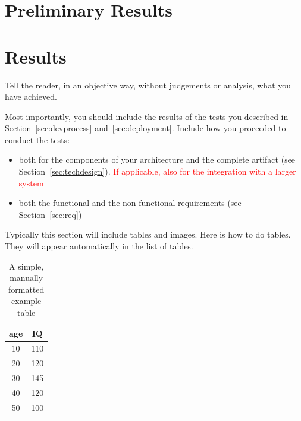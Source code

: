 \ifmidterm
\chapter{Preliminary Results}
\else
\chapter{Results}
\fi
\label{chap:results}
\begin{instructions}
Tell the reader, in an objective way, without judgements or analysis, what you have achieved.
\begin{onlyfinal}
Most importantly, you should include the results of the tests you described in Section~\ref{sec:devprocess} and~\ref{sec:deployment}. Include how you proceeded to conduct the tests:
\begin{itemize}
    \item both for the components of your architecture and the complete artifact (see Section~\ref{sec:techdesign}). \textcolor{red}{If applicable, also for the integration with a larger system}
    \item both the functional and the non-functional requirements (see Section~\ref{sec:req})
\end{itemize}
\end{onlyfinal}

Typically this section will include tables and images. Here is how to do tables. They will appear automatically in the list of tables.
\begin{table}[ht]
  \centering
  \caption{A simple, manually formatted example table}
  \label{tab:example1}
  \begin{tabular}{cc}
    \hline
    age  & IQ \\
    \hline
    10   & 110 \\
    20   & 120 \\
    30   & 145 \\
    40   & 120 \\
    50   & 100 \\
    \hline
  \end{tabular}
\end{table}

\begin{table}[ht]
  \centering
  \caption[A simple example table generated from a CSV file]{A simple example table generated from a CSV file using \texttt{simplecsv} and \texttt{booktab}}
  \label{tab:examplecsv}
\end{table}


\end{instructions}
